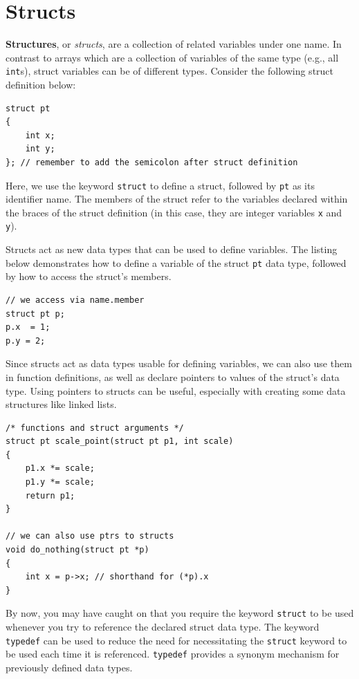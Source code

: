\section{Structs}

\textbf{Structures}, or \textit{structs}, are a collection of related variables under one name.
In contrast to arrays which are a collection of variables of the same type (e.g., all \verb|int|s), struct variables can be of different types.
Consider the following struct definition below:

\begin{verbatim}
struct pt
{
    int x;
    int y;
}; // remember to add the semicolon after struct definition
\end{verbatim}

Here, we use the keyword \verb|struct| to define a struct, followed by \verb|pt| as its identifier name.
The members of the struct refer to the variables declared within the braces of the struct definition (in this case, they are integer variables \verb|x| and \verb|y|).

Structs act as new data types that can be used to define variables.
The listing below demonstrates how to define a variable of the struct \verb|pt| data type, followed by how to access the struct's members.

\begin{verbatim}
// we access via name.member
struct pt p;
p.x  = 1;
p.y = 2;
\end{verbatim}

Since structs act as data types usable for defining variables, we can also use them in function definitions, as well as declare pointers to values of the struct's data type.
Using pointers to structs can be useful, especially with creating some data structures like linked lists.

\begin{verbatim}
/* functions and struct arguments */
struct pt scale_point(struct pt p1, int scale)
{
    p1.x *= scale;
    p1.y *= scale;
    return p1;
}

// we can also use ptrs to structs
void do_nothing(struct pt *p)
{
    int x = p->x; // shorthand for (*p).x
}
\end{verbatim}

By now, you may have caught on that you require the keyword \verb|struct| to be used whenever you try to reference the declared struct data type.
The keyword \verb|typedef| can be used to reduce the need for necessitating the \verb|struct| keyword to be used each time it is referenced.
\verb|typedef| provides a synonym mechanism for previously defined data types.

